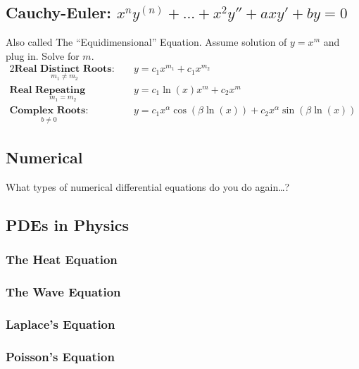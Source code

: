 \documentclass{article}
\begin{document}
\subsection*{Cauchy-Euler: $x^ny^{(n)}+...+x^2y''+axy'+by=0$}
    Also called The ``Equidimensional'' Equation. Assume solution of $y=x^m$ and plug in. Solve for $m$.
    \begin{alignat}{2}
        \underset { m_1 \neq m_2}{\textbf{Real Distinct Roots:}}
        &\quad y=c_1x^{m_1}+c_1x^{m_2}\\[0.7 cm]
        \underset{m_1=m_2}{\textbf{Real Repeating Roots:}}
        &\quad y=c_1\ln(x)x^m+c_2x^m\\[0.7 cm]
        \underset{b \neq 0}{\textbf{Complex Roots:}}
        &\quad y=c_{1}x^{\alpha }\cos(\beta \ln(x))+c_{2}x^{\alpha }\sin(\beta \ln(x))
    \end{alignat}
\subsection{Numerical}

    What types of numerical differential equations do you do again\ldots?
\subsection{PDEs in Physics}
    \subsubsection{The Heat Equation} %
    \subsubsection{The Wave Equation} %
    \subsubsection{Laplace's Equation} %
    \subsubsection{Poisson's Equation} %
\end{document}

